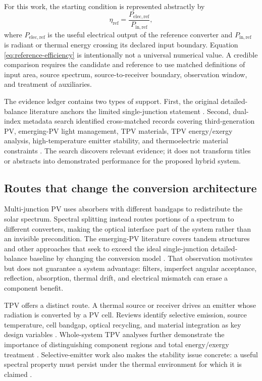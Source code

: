 \documentclass[conference]{../../../../Conference-LaTeX-template_10-17-19/IEEEtran}
\begin{document}
For this work, the starting condition is represented abstractly by
\begin{equation}
\eta_{\mathrm{ref}}=\frac{P_{\mathrm{elec,ref}}}{P_{\mathrm{in,ref}}},
\label{eq:reference-efficiency}
\end{equation}
where $P_{\mathrm{elec,ref}}$ is the useful electrical output of the reference converter and $P_{\mathrm{in,ref}}$ is radiant or thermal energy crossing its declared input boundary. Equation \eqref{eq:reference-efficiency} is intentionally not a universal numerical value. A credible comparison requires the candidate and reference to use matched definitions of input area, source spectrum, source-to-receiver boundary, observation window, and treatment of auxiliaries.

The evidence ledger contains two types of support. First, the original detailed-balance literature anchors the limited single-junction statement \cite{shockley_queisser_1961}. Second, dual-index metadata search identified cross-matched records covering third-generation PV, emerging-PV light management, TPV materials, TPV energy/exergy analysis, high-temperature emitter stability, and thermoelectric material constraints \cite{shah_etal_2023,anctil_etal_2023,dada_etal_2023,utlu_onal_2017,chirumamilla_etal_2019,alfartoos_etal_2023}. The search discovers relevant evidence; it does not transform titles or abstracts into demonstrated performance for the proposed hybrid system.

\subsection{Routes that change the conversion architecture}
Multi-junction PV uses absorbers with different bandgaps to redistribute the solar spectrum. Spectral splitting instead routes portions of a spectrum to different converters, making the optical interface part of the system rather than an invisible precondition. The emerging-PV literature covers tandem structures and other approaches that seek to exceed the ideal single-junction detailed-balance baseline by changing the conversion model \cite{shah_etal_2023,anctil_etal_2023}. That observation motivates but does not guarantee a system advantage: filters, imperfect angular acceptance, reflection, absorption, thermal drift, and electrical mismatch can erase a component benefit.

TPV offers a distinct route. A thermal source or receiver drives an emitter whose radiation is converted by a PV cell. Reviews identify selective emission, source temperature, cell bandgap, optical recycling, and material integration as key design variables \cite{dada_etal_2023}. Whole-system TPV analyses further demonstrate the importance of distinguishing component regions and total energy/exergy treatment \cite{utlu_onal_2017}. Selective-emitter work also makes the stability issue concrete: a useful spectral property must persist under the thermal environment for which it is claimed \cite{chirumamilla_etal_2019}.
\end{document}
